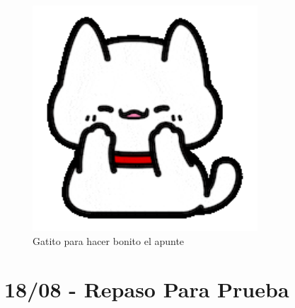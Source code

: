 \documentclass[12pt, letterpaper]{article}
\begin{document}
\begin{figure}[h!]
	\centering
	\includegraphics[width=0.75\textwidth]{Gat}
	\caption{Gatito para hacer bonito el apunte}
	\label{fig:Gat}
\end{figure}
\newpage

\section{18/08 - Repaso Para Prueba}
\end{document}
